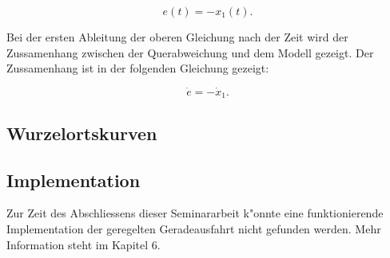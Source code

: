 \begin{equation}
    e(t) = -x_1(t).
\end{equation}

Bei der ersten Ableitung der oberen Gleichung nach der Zeit wird der Zussamenhang zwischen der Querabweichung und dem Modell gezeigt. Der Zussamenhang ist in der folgenden Gleichung gezeigt:

\begin{equation}
    \dot{e} = -\dot{x}_1.
\end{equation}

\subsection{Wurzelortskurven}    

\subsection{Implementation}

Zur Zeit des Abschliessens dieser Seminararbeit k"onnte eine funktionierende Implementation der geregelten Geradeausfahrt nicht gefunden werden. Mehr Information steht im Kapitel 6.\\




